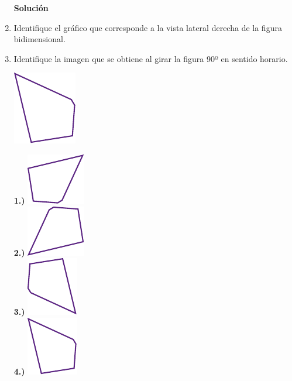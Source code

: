 \documentclass[11pt, a4paper]{article} %
\theoremstyle{dotlessP}
\theoremstyle{dotlessS}
\begin{document}
\begin{enumerate}[label=\color{dg}\theenumi.]
 \textbf{Solución}
   \item {\color{db} Identifique el gráfico que corresponde a la vista lateral derecha de la figura bidimensional. 
        }
   \item {\color{db} Identifique la imagen que se obtiene al girar la figura 90º en sentido horario.
        }
         \begin{center}
    \includegraphics[scale=1]{Figuras/131_1.pdf}\\
    \end{center}
     {\color{dh} \textbf{1.)} }   
	\includegraphics[scale=0.1]{Figuras/131_2-1.pdf}\\
          {\color{dh} \textbf{2.)} }   
    \includegraphics[scale=0.1]{Figuras/131_2-2.pdf}\\
          {\color{dh} \textbf{3.)} }   
    \includegraphics[scale=0.1]{Figuras/131_2-3.pdf}\\
          {\color{dh} \textbf{4.)} }   
    \includegraphics[scale=0.1]{Figuras/131_2-4.pdf}

\end{enumerate}
\end{document}
